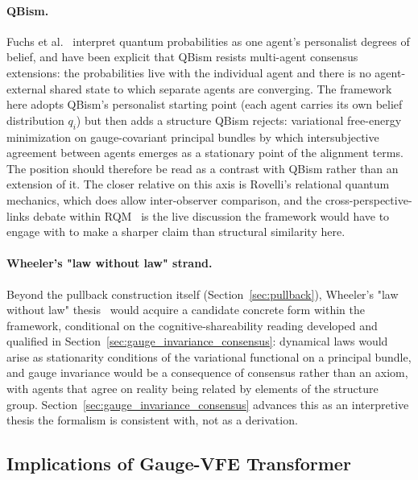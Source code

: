\documentclass[11pt]{article}
\begin{document}
\paragraph{QBism.} Fuchs et al.\ \cite{Fuchs2014, Fuchs2017} interpret quantum probabilities as one agent's personalist degrees of belief, and have been explicit that QBism resists multi-agent consensus extensions: the probabilities live with the individual agent and there is no agent-external shared state to which separate agents are converging. The framework here adopts QBism's personalist starting point (each agent carries its own belief distribution $q_i$) but then adds a structure QBism rejects: variational free-energy minimization on gauge-covariant principal bundles by which intersubjective agreement between agents emerges as a stationary point of the alignment terms. The position should therefore be read as a contrast with QBism rather than an extension of it. The closer relative on this axis is Rovelli's relational quantum mechanics, which does allow inter-observer comparison, and the cross-perspective-links debate within RQM~\cite{Brukner2018, AdlamRovelli2022} is the live discussion the framework would have to engage with to make a sharper claim than structural similarity here.

\paragraph{Wheeler's "law without law" strand.} Beyond the pullback construction itself (Section~\ref{sec:pullback}), Wheeler's "law without law" thesis~\cite{Wheeler1990} would acquire a candidate concrete form within the framework, conditional on the cognitive-shareability reading developed and qualified in Section~\ref{sec:gauge_invariance_consensus}: dynamical laws would arise as stationarity conditions of the variational functional on a principal bundle, and gauge invariance would be a consequence of consensus rather than an axiom, with agents that agree on reality being related by elements of the structure group. Section~\ref{sec:gauge_invariance_consensus} advances this as an interpretive thesis the formalism is consistent with, not as a derivation.

\subsection{Implications of Gauge-VFE Transformer}
\end{document}
